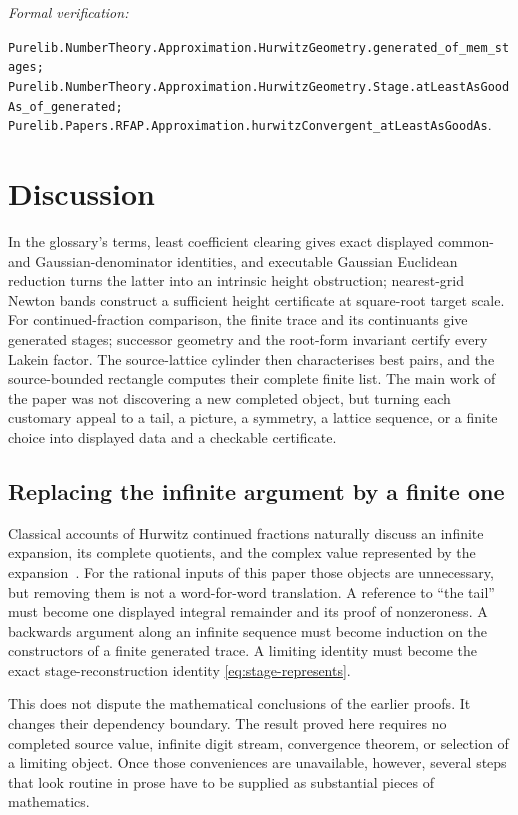 \documentclass[11pt]{article}
\newcommand{\leanref}[1]{\par\smallskip\noindent
  \emph{Formal verification:}\par\nobreak
  {\raggedright\nolinkurl{#1}.\par}}
\begin{document}
\leanref{Purelib.NumberTheory.Approximation.HurwitzGeometry.generated_of_mem_stages;
Purelib.NumberTheory.Approximation.HurwitzGeometry.Stage.atLeastAsGoodAs_of_generated;
Purelib.Papers.RFAP.Approximation.hurwitzConvergent_atLeastAsGoodAs}

\section{Discussion}
\label{sec:discussion}

In the glossary's terms, least coefficient clearing gives exact displayed
common- and Gaussian-denominator identities, and executable Gaussian
Euclidean reduction turns the latter into an intrinsic height obstruction;
nearest-grid Newton bands construct a sufficient height certificate at
square-root target scale.  For
continued-fraction comparison, the finite trace and its continuants give
generated stages; successor geometry and the root-form invariant certify
every Lakein factor.  The source-lattice cylinder then characterises best
pairs, and the source-bounded rectangle computes their complete finite list.
The main work of the paper was not discovering a new completed object, but
turning each customary appeal to a tail, a picture, a symmetry, a lattice
sequence, or a finite choice into displayed data and a checkable certificate.

\subsection{Replacing the infinite argument by a finite one}

Classical accounts of Hurwitz continued fractions naturally discuss an
infinite expansion, its complete quotients, and the complex value represented
by the expansion~\cite{HurwitzComplexCF,LeVequeGaussianCF,LakeinApproximation}.
For the rational inputs of this paper those objects are unnecessary, but
removing them is not a word-for-word translation.  A reference to ``the
tail'' must become one displayed integral remainder and its proof of
nonzeroness.  A backwards argument along an infinite sequence must become
induction on the constructors of a finite generated trace.  A limiting
identity must become the exact stage-reconstruction identity
\eqref{eq:stage-represents}.

This does not dispute the mathematical conclusions of the earlier proofs.
It changes their dependency boundary.  The result proved here requires no
completed source value, infinite digit stream, convergence theorem, or
selection of a limiting object.  Once those conveniences are unavailable,
however, several steps that look routine in prose have to be supplied as
substantial pieces of mathematics.
\end{document}
